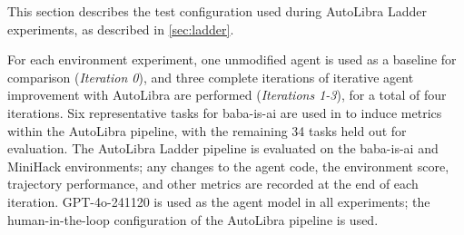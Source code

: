 This section describes the test configuration used during AutoLibra Ladder
experiments, as described in \ref{sec:ladder}.

For each environment experiment, one unmodified agent is used as a baseline for
comparison (\textit{Iteration 0}), and three complete iterations of iterative
agent improvement with AutoLibra are performed (\textit{Iterations 1-3}), for a
total of four iterations. Six representative tasks for baba-is-ai are used in to
induce metrics within the AutoLibra pipeline, with the remaining 34 tasks held
out for evaluation. The AutoLibra Ladder pipeline is evaluated on the baba-is-ai
and MiniHack environments; any changes to the agent code, the environment score,
trajectory performance, and other metrics are recorded at the end of each iteration.
GPT-4o-241120 \cite{openai2024gpt4ocard} is used as the agent model in all
experiments; the human-in-the-loop configuration of the AutoLibra pipeline is used.